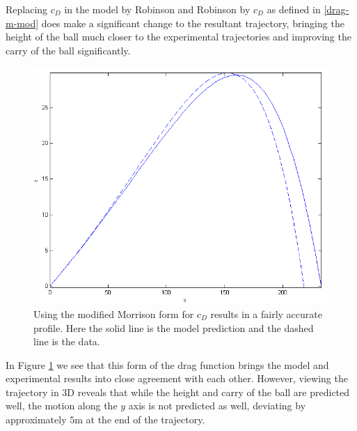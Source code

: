 Replacing $c_D$ in the model by Robinson and Robinson by $c_D$ as defined in \eqref{drag-m-mod} does
make a significant change to the resultant trajectory, bringing the height of the ball much closer to
the experimental trajectories and improving the carry of the ball significantly.


\begin{figure}[h]
\centering
\includegraphics[scale=0.8]{../images/m-mod-data1.png}
\caption[Model with using the modified Morrison form for $c_D$.]{Using the modified Morrison form for $c_{D}$ results 
in a fairly accurate profile. Here the solid line is the model prediction 
and the dashed line is the data.}
\label{m-mod-data1}
\end{figure}

In Figure \ref{m-mod-data1} we see that this form of the drag function brings the model and experimental
results into close agreement with each other. However, viewing the trajectory in 3D reveals that while
the height and carry of the ball are predicted well, the motion along the $y$ axis is not predicted
as well, deviating by approximately $5$m at the end of the trajectory.

